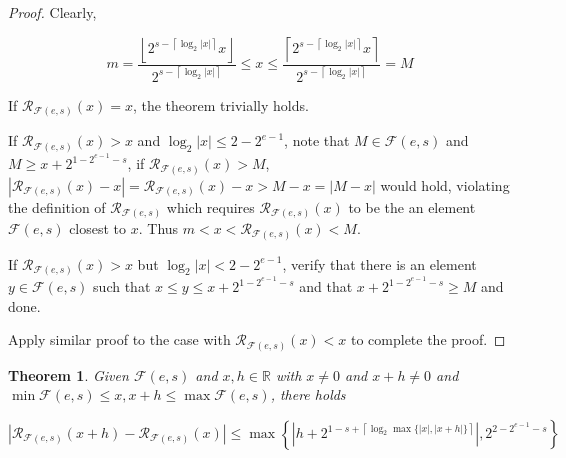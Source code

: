 \documentclass{book}
\newtheorem{theorem}{Theorem}
\theoremstyle{definition}\newtheorem{mechanism}{Mechanism}
\theoremstyle{remark}\newtheorem*{remark}{Remark}
\begin{document}
\begin{proof}
	Clearly,
	
	\begin{equation*}
		m = \frac{\left\lfloor 2 ^{s - \left\lceil \log_2 |x| \right\rceil}x\right\rfloor}{2 ^{s - \left\lceil \log_2 |x| \right\rceil}} \le x \le \frac{\left\lceil 2 ^{s - \left\lceil \log_2 |x| \right\rceil}x\right\rceil}{2 ^{s - \left\lceil \log_2 |x| \right\rceil}}  = M
	\end{equation*}
	
	If $\mathcal R_{\mathcal F(e, s)}(x) = x$, the theorem trivially holds.
	
	If $\mathcal R_{\mathcal F(e, s)}(x) > x$ and
	$\log_2 |x| \le 2 - 2^{e - 1}$, note that $M \in \mathcal F(e, s)$ and $M \ge x + 2^{1 - 2^{e - 1} - s}$, if $\mathcal R_{\mathcal F(e, s)}(x) > M$, $|\mathcal R_{\mathcal F(e, s)}(x) - x| = \mathcal R_{\mathcal F(e, s)}(x) - x > M - x = |M - x|$ would hold, violating the definition of $\mathcal R_{\mathcal F(e, s)}$ which requires $\mathcal R_{\mathcal F(e, s)}(x)$ to be the an element $\mathcal F(e, s)$ closest to $x$. Thus $m < x < \mathcal R_{\mathcal F(e, s)}(x) < M$.
	
	If $\mathcal R_{\mathcal F(e, s)}(x) > x$ but
	$\log_2 |x| < 2 - 2^{e - 1}$, verify that there is an element $y \in \mathcal F(e, s)$ such that $x \le y \le  x + 2^{1 - 2^{e - 1} - s}$ and that $x + 2^{1 - 2^{e - 1} - s} \ge M$ and done.
	
	Apply similar proof to the case with $\mathcal R_{\mathcal F(e, s)}(x) < x$ to complete the proof.
\end{proof}

\begin{theorem}\label{thm:round-stability}
	Given $\mathcal F(e, s)$ and $x, h\in \mathbb R$ with $x \ne 0$ and $x + h \ne 0$ and $\min \mathcal F(e, s) \le x, x + h \le \max \mathcal F(e, s)$, there holds
	
	\begin{equation*}
		\left| \mathcal R_{\mathcal F(e, s)} (x + h) - \mathcal R_{\mathcal F(e, s)} (x) \right| \le \max \left\{\left|h + 2^{1 - s + \left\lceil \log_2 \max\{|x|, |x + h|\} \right\rceil}\right|, 2^{2 -2^{e - 1} - s}\right\}
	\end{equation*}
\end{theorem}
\end{document}
